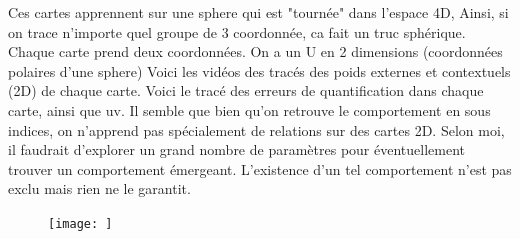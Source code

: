 \documentclass[../main]{subfiles}
\begin{document}
Ces cartes apprennent sur une sphere qui est "tournée" dans l'espace 4D, Ainsi, si on trace n'importe quel groupe de 3 coordonnée, ca fait un truc sphérique. Chaque carte prend deux coordonnées.
On a un U en 2 dimensions (coordonnées polaires d'une sphere)
Voici les vidéos des tracés des poids externes et contextuels (2D) de chaque carte.
Voici le tracé des erreurs de quantification dans chaque carte, ainsi que uv.
Il semble que bien qu'on retrouve le comportement en sous indices, on n'apprend pas spécialement de relations sur des cartes 2D. Selon moi, il faudrait d'explorer un grand nombre de paramètres pour éventuellement trouver un comportement émergeant. L'existence d'un tel comportement n'est pas exclu mais rien ne le garantit.

\begin{figure}
	\texttt{[image: ]}
\end{figure}

\ifSubfilesClassLoaded{
    \printbibliography
}{}
\end{document}

